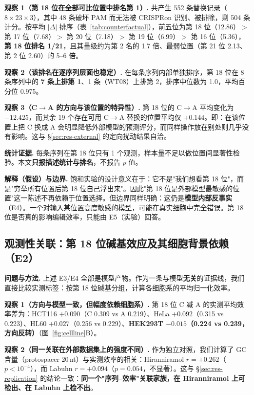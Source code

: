 \textbf{观察 1（第 18 位在全部可比位置中排名第 1）.} 共产生 552 条替换记录（$8\times23\times3$），其中 48 条破坏 PAM 而无法被 CRISPRon 识别、被排除，剩 504 条计分。按平均 $|\Delta|$ 排序（表~\ref{tab:counterfactual}），前五位为第 18 位（12.86）$>$ 第 17 位（7.68）$>$ 第 20 位（7.18）$>$ 第 19 位（6.99）$>$ 第 16 位（5.36），\textbf{第 18 位排名 1/21}，且其量级约为第 2 名的 1.7 倍、最弱位置（第 21 位 2.13、第 2 位 2.60）的 5--6 倍。

\textbf{观察 2（该排名在逐序列层面也稳定）.} 在每条序列内部单独排序，第 18 位在 8 条序列中的 \textbf{7 条上排第 1}、1 条（WT08）上排第 2，排序中位数为 1.0，平均百分位 0.975。

\textbf{观察 3（C$\rightarrow$A 的方向与该位置的特异性）.} 第 18 位的 C$\rightarrow$A 平均变化为 $\mathbf{-12.425}$，而其余 19 个存在可用 C$\rightarrow$A 替换的位置平均仅 $+0.144$。即：在该位置上把 C 换成 A 会明显降低外部模型的预测评分，而同样操作放在别处则几乎没有影响。这与 \S\ref{sec:res-external} 的定向扰动结果自洽。

\textbf{统计证据.} 每条序列在第 18 位只有 1 个观测，样本量不足以做位置间显著性检验。本文\textbf{只报描述统计与排名}，不报告 $p$ 值。

\textbf{解释（假设）与边界.} 饱和实验的设计意义在于：它不是"我们想看第 18 位"，而是"穷举所有位置后第 18 位自己浮出来"。因此"第 18 位是外部模型最敏感的位置"这一陈述不再依赖于位置选择。但边界同样明确：这仍是\textbf{模型内部反事实}（E4）。一个对输入某位置高度敏感的模型，可能在真实细胞中完全错误。第 18 位是否真的影响编辑效率，只能由 E5（实验）回答。



\subsection{观测性关联：第 18 位碱基效应及其细胞背景依赖（E2）}
\label{sec:res-association}

\textbf{问题与方法.} 上述 E3/E4 全部是模型产物。作为一条与模型\textbf{无关}的证据线，我们直接比较实测标签：按第 18 位碱基分组，计算各细胞系的平均归一化效率。

\textbf{观察 1（方向与模型一致，但幅度依赖细胞系）.} 第 18 位 C 减 A 的实测平均效率差为：HCT116 $+0.090$（C 0.309 vs A 0.219）、HeLa $+0.092$（0.315 vs 0.223）、HL60 $+0.027$（0.256 vs 0.229）、\textbf{HEK293T $-0.015$（0.224 vs 0.239，方向反转）}（图~\ref{fig:cellline}B）。

\textbf{观察 2（同一关联在外部数据集上的强度不同）.} 作为独立对照，我们计算了 GC 含量（protospacer 20\,nt）与实测效率的相关：Hiranniramol $r=+0.262$（$p<10^{-4}$），而 Labuhn $r=+0.094$（$p=0.054$，不显著）。这与 \S\ref{sec:res-replication} 的结论一致：\textbf{同一个"序列–效率"关联家族，在 Hiranniramol 上可检出、在 Labuhn 上检不出}。

